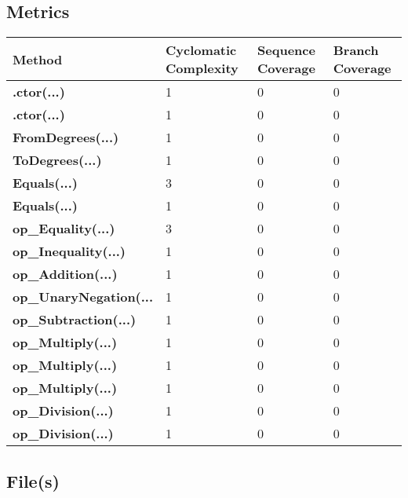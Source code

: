 \documentclass[a4paper,10pt]{article}
\begin{document}
\subsection{Metrics}
\begin{longtable}[l]{|l|l|l|l|}
\hline
\textbf{Method} & \textbf{Cyclomatic Complexity} & \textbf{Sequence Coverage} & \textbf{Branch Coverage}\\
\hline
\textbf{.ctor(...)} & 1 & 0 & 0\\
\hline
\textbf{.ctor(...)} & 1 & 0 & 0\\
\hline
\textbf{FromDegrees(...)} & 1 & 0 & 0\\
\hline
\textbf{ToDegrees(...)} & 1 & 0 & 0\\
\hline
\textbf{Equals(...)} & 3 & 0 & 0\\
\hline
\textbf{Equals(...)} & 1 & 0 & 0\\
\hline
\textbf{op\_Equality(...)} & 3 & 0 & 0\\
\hline
\textbf{op\_Inequality(...)} & 1 & 0 & 0\\
\hline
\textbf{op\_Addition(...)} & 1 & 0 & 0\\
\hline
\textbf{op\_UnaryNegation(...} & 1 & 0 & 0\\
\hline
\textbf{op\_Subtraction(...)} & 1 & 0 & 0\\
\hline
\textbf{op\_Multiply(...)} & 1 & 0 & 0\\
\hline
\textbf{op\_Multiply(...)} & 1 & 0 & 0\\
\hline
\textbf{op\_Multiply(...)} & 1 & 0 & 0\\
\hline
\textbf{op\_Division(...)} & 1 & 0 & 0\\
\hline
\textbf{op\_Division(...)} & 1 & 0 & 0\\
\hline
\end{longtable}
\subsection{File(s)}
\end{document}
